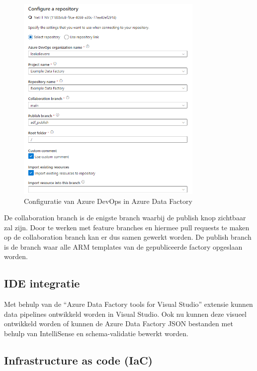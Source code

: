 
\begin{figure}[H]
    \centering
    \includegraphics[width=0.8\textwidth]{./graphics/adf/setup_repository_3_specific.png}
    \caption{Configuratie van Azure DevOps in Azure Data Factory}
\end{figure}

De collaboration branch is de enigste branch waarbij de publish knop zichtbaar zal zijn. Door te werken met feature branches en hiermee pull requests te maken op de collaboration branch kan er dus samen gewerkt worden. De publish branch is de branch waar alle ARM templates van de gepubliceerde factory opgeslaan worden.


\subsection{IDE integratie}

Met behulp van de ``Azure Data Factory tools for Visual Studio'' extensie kunnen data pipelines ontwikkeld worden in Visual Studio. Ook nu kunnen deze visueel ontwikkeld worden of kunnen de Azure Data Factory JSON bestanden met behulp van IntelliSense en schema-validatie bewerkt worden.

\subsection{Infrastructure as code (IaC)}

